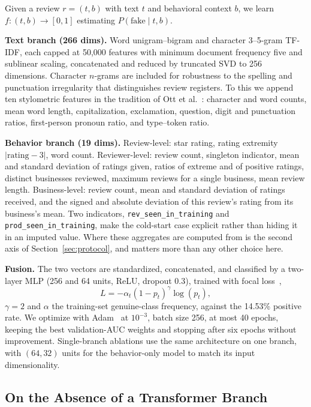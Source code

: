 \documentclass[conference]{IEEEtran}
\begin{document}
Given a review $r = (t, b)$ with text $t$ and behavioral context $b$, we learn
$f : (t, b) \rightarrow [0,1]$ estimating $P(\text{fake} \mid t, b)$.

\textbf{Text branch (266 dims).} Word unigram--bigram and character 3--5-gram
TF-IDF, each capped at 50{,}000 features with minimum document frequency five
and sublinear scaling, concatenated and reduced by truncated SVD to 256
dimensions. Character $n$-grams are included for robustness to the spelling and
punctuation irregularity that distinguishes review registers. To this we append
ten stylometric features in the tradition of Ott et al.~\cite{ott2011finding}:
character and word counts, mean word length, capitalization, exclamation,
question, digit and punctuation ratios, first-person pronoun ratio, and
type--token ratio.

\textbf{Behavior branch (19 dims).} Review-level: star rating, rating extremity
$|{\text{rating}} - 3|$, word count. Reviewer-level: review count, singleton
indicator, mean and standard deviation of ratings given, ratios of extreme and
of positive ratings, distinct businesses reviewed, maximum reviews for a single
business, mean review length. Business-level: review count, mean and standard
deviation of ratings received, and the signed and absolute deviation of this
review's rating from its business's mean. Two indicators,
\texttt{rev\_seen\_in\_training} and \texttt{prod\_seen\_in\_training}, make the
cold-start case explicit rather than hiding it in an imputed value. Where these
aggregates are computed from is the second axis of
Section~\ref{sec:protocol}, and matters more than any other choice here.

\textbf{Fusion.} The two vectors are standardized, concatenated, and classified
by a two-layer MLP (256 and 64 units, ReLU, dropout 0.3), trained with focal
loss~\cite{lin2017focal},
\begin{equation}
    L = -\alpha_t (1 - p_t)^{\gamma} \log(p_t),
\end{equation}
\noindent $\gamma = 2$ and $\alpha$ the training-set genuine-class frequency,
against the 14.53\% positive rate. We optimize with Adam~\cite{kingma2015adam}
at $10^{-3}$, batch size 256, at most 40 epochs, keeping the best validation-AUC
weights and stopping after six epochs without improvement. Single-branch
ablations use the same architecture on one branch, with $(64, 32)$ units for the
behavior-only model to match its input dimensionality.

\subsection{On the Absence of a Transformer Branch}
\end{document}

